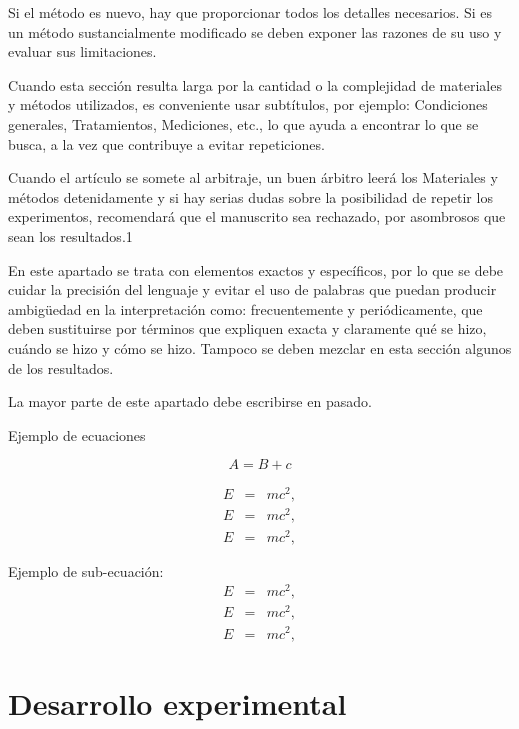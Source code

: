 \documentclass[%
 reprint,
groupedaddress,
unsortedaddress,
 amsmath,amssymb,
 aps,
superscriptaddress
]{revtex4-2}
\begin{document}
Si el método es nuevo, hay que proporcionar todos los detalles necesarios. Si es un 
método sustancialmente modificado se deben exponer las razones de su uso y evaluar sus 
limitaciones.

Cuando esta sección resulta larga por la cantidad o la complejidad de materiales y 
métodos utilizados, es conveniente usar subtítulos, por ejemplo: Condiciones generales, 
Tratamientos, Mediciones, etc., lo que ayuda a encontrar lo que se busca, a la vez que 
contribuye a evitar repeticiones. 

Cuando el artículo se somete al arbitraje, un buen árbitro leerá los Materiales y métodos 
detenidamente y si hay serias dudas sobre la posibilidad de repetir los experimentos, 
recomendará que el manuscrito sea rechazado, por asombrosos que sean los resultados.1

En este apartado se trata con elementos exactos y específicos, por lo que se debe cuidar 
la precisión del lenguaje y evitar el uso de palabras que puedan producir ambigüedad en 
la interpretación como: frecuentemente y periódicamente, que deben sustituirse por 
términos que expliquen exacta y claramente qué se hizo, cuándo se hizo y cómo se hizo. 
Tampoco se deben mezclar en esta sección algunos de los resultados.

La mayor parte de este apartado debe escribirse en pasado.



Ejemplo de ecuaciones

\begin{equation}\label{EQ:001}
	A = B+c
\end{equation}

\begin{eqnarray}
	E&=&mc^2,\label{equationa}
	\\
	E&=&mc^2,\label{equationb}
	\\
	E&=&mc^2,\label{equationc}
\end{eqnarray}


Ejemplo de sub-ecuación:
\begin{subequations}
	\label{allequations} %
	\begin{eqnarray}
		E&=&mc^2,\label{equationa}
		\\
		E&=&mc^2,\label{equationb}
		\\
		E&=&mc^2,\label{equationc}
	\end{eqnarray}
\end{subequations}


\section{Desarrollo experimental}
\end{document}

